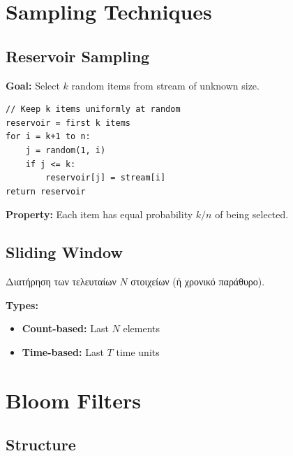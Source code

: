 \section{Sampling Techniques}

\subsection{Reservoir Sampling}

\begin{algorithmbox}
\textbf{Goal:} Select $k$ random items from stream of unknown size.

\begin{lstlisting}[language=pseudo]
// Keep k items uniformly at random
reservoir = first k items
for i = k+1 to n:
    j = random(1, i)
    if j <= k:
        reservoir[j] = stream[i]
return reservoir
\end{lstlisting}

\textbf{Property:} Each item has equal probability $k/n$ of being selected.
\end{algorithmbox}

\subsection{Sliding Window}

\begin{definitionbox}
Διατήρηση των τελευταίων $N$ στοιχείων (ή χρονικό παράθυρο).

\textbf{Types:}
\begin{itemize}
    \item \textbf{Count-based:} Last $N$ elements
    \item \textbf{Time-based:} Last $T$ time units
\end{itemize}
\end{definitionbox}

\section{Bloom Filters}

\subsection{Structure}

